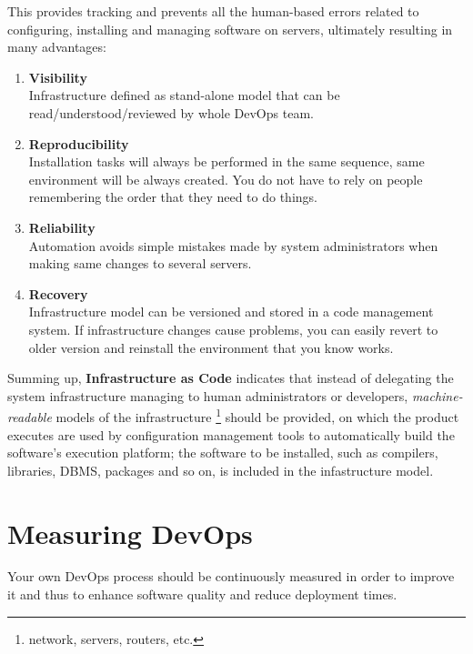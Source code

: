 This provides tracking and prevents all the human-based errors related to configuring, installing and managing software on servers, 
ultimately resulting in many advantages:
\begin{enumerate}
   \item \textbf{Visibility}\\
   Infrastructure defined as stand-alone model that can be
   read/understood/reviewed by whole DevOps team.
   \item \textbf{Reproducibility}\\
   Installation tasks will always be performed in the same sequence, same
   environment will be always created. You do not have to rely on people
   remembering the order that they need to do things.
   \item \textbf{Reliability}\\
   Automation avoids simple mistakes made by system administrators when
   making same changes to several servers.
   \item \textbf{Recovery}\\
   Infrastructure model can be versioned and stored in a code management
   system. If infrastructure changes cause problems, you can easily revert
   to older version and reinstall the environment that you know works.
\end{enumerate}
\nl

Summing up, \textbf{Infrastructure as Code} indicates that instead of delegating the system infrastructure managing to human administrators or developers,
\textit{machine-readable} models of the infrastructure \footnote{network, servers, routers, etc.} should be provided, on which the product executes
are used by configuration management tools to automatically build the
software’s execution platform; 
the software to be installed, such as compilers, libraries, DBMS, packages and so on, is included in the infastructure model.


\section{Measuring DevOps}
Your own DevOps process should be continuously measured in order to improve it and thus to enhance software quality and reduce deployment times.

